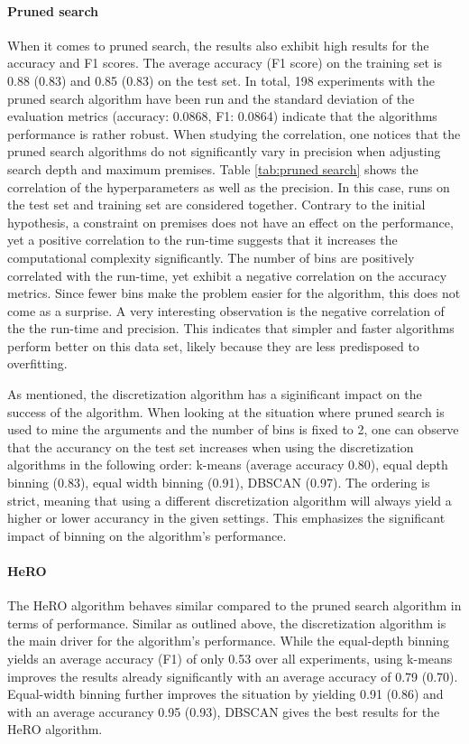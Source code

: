 \paragraph*{Pruned search} When it comes to pruned search, the results also exhibit high results for the accuracy and F1 scores. The average accuracy (F1 score) on the training set is 0.88 (0.83) and 0.85 (0.83) on the test set. In total, 198 experiments with the pruned search algorithm have been run and the standard deviation of the evaluation metrics (accuracy: 0.0868, F1: 0.0864) indicate that the algorithms performance is rather robust. When studying the correlation, one notices that the pruned search algorithms do not significantly vary in precision when adjusting search depth and maximum premises. Table \ref{tab:pruned search} shows the correlation of the hyperparameters as well as the precision. In this case, runs on the test set and training set are considered together. Contrary to the initial hypothesis, a constraint on premises does not have an effect on the performance, yet a positive correlation to the run-time suggests that it increases the computational complexity significantly. The number of bins are positively correlated with the run-time, yet exhibit a negative correlation on the accuracy metrics. Since fewer bins make the problem easier for the algorithm, this does not come as a surprise. A very interesting observation is the negative correlation of the the run-time and precision. This indicates that simpler and faster algorithms perform better on this data set, likely because they are less predisposed to overfitting. 

As mentioned, the discretization algorithm has a siginificant impact on the success of the algorithm. When looking at the situation where pruned search is used to mine the arguments and the number of bins is fixed to 2, one can observe that the accurancy on the test set increases when using the discretization algorithms in the following order: k-means (average accuracy 0.80), equal depth binning (0.83), equal width binning (0.91), DBSCAN (0.97). The ordering is strict, meaning that using a different discretization algorithm will always yield a higher or lower accurancy in the given settings. This emphasizes the  significant impact of binning on the algorithm's performance. 

\paragraph*{HeRO} The HeRO algorithm behaves similar compared to the pruned search algorithm in terms of performance. Similar as outlined above, the discretization algorithm is the main driver for the algorithm's performance. While the equal-depth binning yields an average accuracy (F1) of only 0.53 over all experiments, using k-means improves the results already significantly with an average accuracy of 0.79 (0.70). Equal-width binning further improves the situation by yielding 0.91 (0.86) and with an average accurancy 0.95 (0.93), DBSCAN gives the best results for the HeRO algorithm.


